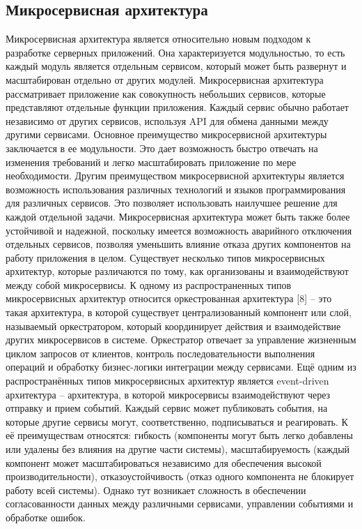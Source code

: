 \subsection{Микросервисная архитектура}

Микросервисная архитектура является относительно новым подходом к разработке серверных приложений. Она характеризуется модульностью, то есть каждый модуль является отдельным сервисом, который может быть развернут и масштабирован отдельно от других модулей. Микросервисная архитектура рассматривает приложение как совокупность небольших сервисов, которые представляют отдельные функции приложения. Каждый сервис обычно работает независимо от других сервисов, используя API для обмена данными между другими сервисами.
Основное преимущество микросервисной архитектуры заключается в ее модульности. Это дает возможность быстро отвечать на изменения требований и легко масштабировать приложение по мере необходимости. Другим преимуществом микросервисной архитектуры является возможность использования различных технологий и языков программирования для различных сервисов. Это позволяет использовать наилучшее решение для каждой отдельной задачи. Микросервисная архитектура может быть также более устойчивой и надежной, поскольку имеется возможность аварийного отключения отдельных сервисов, позволяя уменьшить влияние отказа других компонентов на работу приложения в целом.
Существует несколько типов микросервисных архитектур, которые различаются по тому, как организованы и взаимодействуют между собой микросервисы. К одному из распространенных типов микросервисных архитектур относится оркестрованная архитектура [8] – это такая архитектура, в которой существует централизованный компонент или слой, называемый оркестратором, который координирует действия и взаимодействие других микросервисов в системе. Оркестратор отвечает за управление жизненным циклом запросов от клиентов, контроль последовательности выполнения операций и обработку бизнес-логики интеграции между сервисами. 
Ещё одним из распространённых типов микросервисных архитектур является event-driven архитектура – архитектура, в которой микросервисы взаимодействуют через отправку и прием событий. Каждый сервис может публиковать события, на которые другие сервисы могут, соответственно, подписываться и реагировать. К её преимуществам относятся: гибкость (компоненты могут быть легко добавлены или удалены без влияния на другие части системы), масштабируемость (каждый компонент может масштабироваться независимо для обеспечения высокой производительности), отказоустойчивость (отказ одного компонента не блокирует работу всей системы). Однако тут возникает сложность в обеспечении согласованности данных между различными сервисами, управлении событиями и обработке ошибок. 
